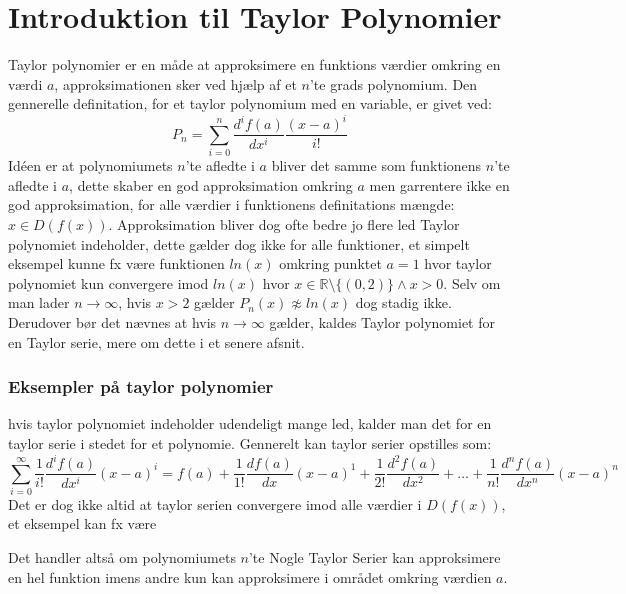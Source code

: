 \chapter{Introduktion til Taylor Polynomier}
\label{ch:ItTP}
Taylor polynomier er en måde at approksimere en funktions værdier omkring en værdi $a$, 
approksimationen sker ved hjælp af et $n$'te grads polynomium. 
Den gennerelle definitation, for et taylor polynomium med en variable, er givet ved:
\[
P_n = \sum^{n}_{i=0} \frac{d^i f(a)}{dx^i} \frac{(x-a)^{i}}{i!}
\]
\label{def:taylorPolynomium}
Idéen er at polynomiumets $n$'te afledte i $a$ bliver det samme som funktionens $n$'te afledte i $a$, 
dette skaber en god approksimation omkring $a$ men garrentere ikke en god approksimation, 
for alle værdier i funktionens definitations mængde: $x \in D(f(x))$. Approksimation bliver dog ofte bedre jo flere led
Taylor polynomiet indeholder, dette gælder dog ikke for alle funktioner, et simpelt eksempel kunne fx være funktionen $ln(x)$
omkring punktet $a=1$ hvor taylor polynomiet kun convergere imod $ln(x)$ hvor $x \in \mathbb{R} \setminus\{(0, 2)\} \land x > 0$. 
Selv om man lader $n \rightarrow \infty$, hvis $x > 2$ gælder $P_n(x) \not \approx ln(x)$ dog stadig ikke.
Derudover bør det nævnes at hvis $n \rightarrow \infty$ gælder, kaldes Taylor polynomiet for en Taylor serie, mere om dette i et senere afsnit. %
\subsection*{Eksempler på taylor polynomier}


hvis taylor polynomiet indeholder udendeligt mange led, 
kalder man det for en taylor serie i stedet for et polynomie. Gennerelt kan taylor serier opstilles som:
\[
\sum^{\infty}_{i=0} \frac{1}{i!} \frac{d^i f(a)}{dx^i} (x-a)^{i} = f(a) + \frac{1}{1!} \frac{df(a)}{dx} (x-a)^{1} + \frac{1}{2!} \frac{d^{2}f(a)}{dx^{2}} + \ldots + \frac{1}{n!} \frac{d^{n} f(a)}{dx^{n}} (x-a)^{n}
\]
\label{def:taylorSerie}
Det er dog ikke altid at taylor serien convergere imod alle værdier i $D(f(x))$, et eksempel kan fx være 


Det handler altså om polynomiumets $n$'te 
Nogle Taylor Serier kan approksimere en hel funktion imens andre kun kan approksimere i området omkring værdien $a$.